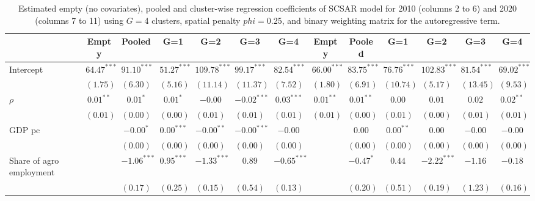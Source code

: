 
\begin{table}
\caption{Estimated empty (no covariates), pooled and cluster-wise regression coefficients of SCSAR model for 2010 (columns 2 to 6) and 2020 (columns 7 to 11) using $G=$4 clusters, spatial penalty $phi=$0.25, and binary weighting matrix for the autoregressive term.}
\begin{center}
\begin{tabular}{l c c c c c c c c c c c c}
\hline
 & Empty & Pooled & G=1 & G=2 & G=3 & G=4 & Empty & Pooled & G=1 & G=2 & G=3 & G=4 \\
\hline
Intercept                         & $64.47^{***}$ & $91.10^{***}$ & $51.27^{***}$ & $109.78^{***}$ & $99.17^{***}$ & $82.54^{***}$ & $66.00^{***}$ & $83.75^{***}$ & $76.76^{***}$ & $102.83^{***}$ & $81.54^{***}$ & $69.02^{***}$ \\
                                  & $(1.75)$      & $(6.30)$      & $(5.16)$      & $(11.14)$      & $(11.37)$     & $(7.52)$      & $(1.80)$      & $(6.91)$      & $(10.74)$     & $(5.17)$       & $(13.45)$     & $(9.53)$      \\
$\rho$                            & $0.01^{**}$   & $0.01^{*}$    & $0.01^{*}$    & $-0.00$        & $-0.02^{***}$ & $0.03^{***}$  & $0.01^{**}$   & $0.01^{**}$   & $0.00$        & $0.01$         & $0.02$        & $0.02^{**}$   \\
                                  & $(0.01)$      & $(0.00)$      & $(0.00)$      & $(0.01)$       & $(0.01)$      & $(0.01)$      & $(0.01)$      & $(0.00)$      & $(0.01)$      & $(0.00)$       & $(0.01)$      & $(0.01)$      \\
GDP pc                            &               & $-0.00^{*}$   & $0.00^{***}$  & $-0.00^{**}$   & $-0.00^{***}$ & $-0.00$       &               & $0.00$        & $0.00^{**}$   & $0.00$         & $-0.00$       & $-0.00$       \\
                                  &               & $(0.00)$      & $(0.00)$      & $(0.00)$       & $(0.00)$      & $(0.00)$      &               & $(0.00)$      & $(0.00)$      & $(0.00)$       & $(0.00)$      & $(0.00)$      \\
Share of agro employment          &               & $-1.06^{***}$ & $0.95^{***}$  & $-1.33^{***}$  & $0.89$        & $-0.65^{***}$ &               & $-0.47^{*}$   & $0.44$        & $-2.22^{***}$  & $-1.16$       & $-0.18$       \\
                                  &               & $(0.17)$      & $(0.25)$      & $(0.15)$       & $(0.54)$      & $(0.13)$      &               & $(0.20)$      & $(0.51)$      & $(0.19)$       & $(1.23)$      & $(0.16)$      \\

\end{tabular}
\end{center}
\end{table}
